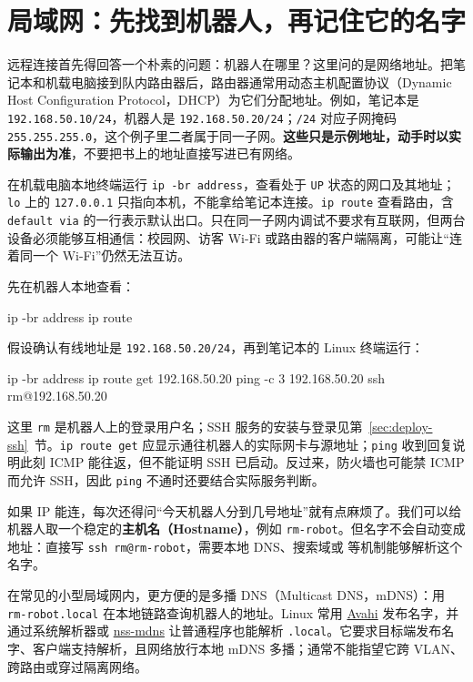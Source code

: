 \section{局域网：先找到机器人，再记住它的名字}
\label{sec:deploy-lan}

远程连接首先得回答一个朴素的问题：机器人在哪里？这里问的是网络地址。把笔记本和机载电脑接到队内路由器后，路由器通常用动态主机配置协议（Dynamic Host Configuration Protocol，DHCP）为它们分配地址。例如，笔记本是 \texttt{192.168.50.10/24}，机器人是 \texttt{192.168.50.20/24}；\texttt{/24} 对应子网掩码 \texttt{255.255.255.0}，这个例子里二者属于同一子网。\textbf{这些只是示例地址，动手时以实际输出为准}，不要把书上的地址直接写进已有网络。

在机载电脑本地终端运行 \texttt{ip -br address}，查看处于 \texttt{UP} 状态的网口及其地址；\texttt{lo} 上的 \texttt{127.0.0.1} 只指向本机，不能拿给笔记本连接。\texttt{ip route} 查看路由，含 \texttt{default via} 的一行表示默认出口。只在同一子网内调试不要求有互联网，但两台设备必须能够互相通信：校园网、访客 Wi-Fi 或路由器的客户端隔离，可能让“连着同一个 Wi-Fi”仍然无法互访。

\begin{example}[按地址检查局域网连通性]
先在机器人本地查看：
\begin{tbash}
ip -br address
ip route
\end{tbash}
假设确认有线地址是 \texttt{192.168.50.20/24}，再到笔记本的 Linux 终端运行：
\begin{tbash}
ip -br address
ip route get 192.168.50.20
ping -c 3 192.168.50.20
ssh rm@192.168.50.20
\end{tbash}
这里 \texttt{rm} 是机器人上的登录用户名；SSH 服务的安装与登录见第~\ref{sec:deploy-ssh}~节。\texttt{ip route get} 应显示通往机器人的实际网卡与源地址；\texttt{ping} 收到回复说明此刻 ICMP 能往返，但不能证明 SSH 已启动。反过来，防火墙也可能禁 ICMP 而允许 SSH，因此 \texttt{ping} 不通时还要结合实际服务判断。
\end{example}

如果 IP 能连，每次还得问“今天机器人分到几号地址”就有点麻烦了。我们可以给机器人取一个稳定的\textbf{主机名（Hostname）}，例如 \texttt{rm-robot}。但名字不会自动变成地址：直接写 \texttt{ssh rm@rm-robot}，需要本地 DNS、搜索域或  等机制能够解析这个名字。

在常见的小型局域网内，更方便的是多播 DNS（Multicast DNS，mDNS）：用 \texttt{rm-robot.local} 在本地链路查询机器人的地址。Linux 常用 \href{https://avahi.org/}{Avahi} 发布名字，并通过系统解析器或 \href{https://github.com/avahi/nss-mdns}{nss-mdns} 让普通程序也能解析 \texttt{.local}。它要求目标端发布名字、客户端支持解析，且网络放行本地 mDNS 多播；通常不能指望它跨 VLAN、跨路由或穿过隔离网络。

